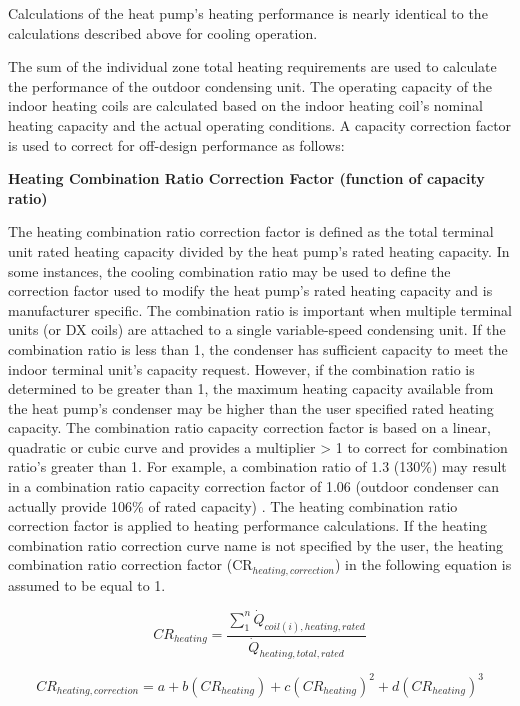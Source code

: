 Calculations of the heat pump's heating performance is nearly identical to the calculations described above for cooling operation.

The sum of the individual zone total heating requirements are used to calculate the performance of the outdoor condensing unit. The operating capacity of the indoor heating coils are calculated based on the indoor heating coil's nominal heating capacity and the actual operating conditions. A capacity correction factor is used to correct for off-design performance as follows:

\textbf{Heating Combination Ratio Correction Factor (function of capacity ratio)}

The heating combination ratio correction factor is defined as the total terminal unit rated heating capacity divided by the heat pump's rated heating capacity. In some instances, the cooling combination ratio may be used to define the correction factor used to modify the heat pump's rated heating capacity and is manufacturer specific. The combination ratio is important when multiple terminal units (or DX coils) are attached to a single variable-speed condensing unit. If the combination ratio is less than 1, the condenser has sufficient capacity to meet the indoor terminal unit's capacity request. However, if the combination ratio is determined to be greater than 1, the maximum heating capacity available from the heat pump's condenser may be higher than the user specified rated heating capacity. The combination ratio capacity correction factor is based on a linear, quadratic or cubic curve and provides a multiplier > 1 to correct for combination ratio's greater than 1. For example, a combination ratio of 1.3 (130\%) may result in a combination ratio capacity correction factor of 1.06 (outdoor condenser can actually provide 106\% of rated capacity) . The heating combination ratio correction factor is applied to heating performance calculations. If the heating combination ratio correction curve name is not specified by the user, the heating combination ratio correction factor (CR\(_{heating,correction}\)) in the following equation is assumed to be equal to 1.

\begin{equation}
  CR_{heating} = \frac{\sum\limits_1^n \dot{Q}_{coil(i),heating,rated}}{\dot{Q}_{heating,total,rated}}
\end{equation}

\begin{equation}
  CR_{heating,correction} = a + b \left( CR_{heating} \right) + c \left( CR_{heating} \right)^2 + d \left( CR_{heating} \right)^3
\end{equation}

